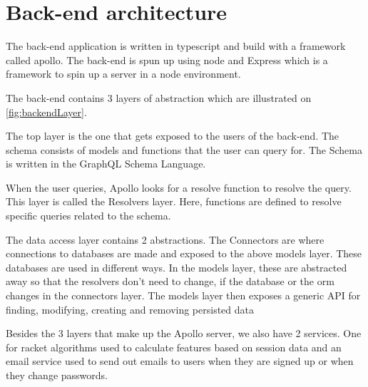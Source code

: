 \section{Back-end architecture}
The back-end application is written in \gls{typescript} and build with a framework called \gls{apollo}.
The back-end is spun up using \gls{node} and Express which is a framework to spin up a server in a \gls{node} environment.

The back-end contains 3 layers of abstraction which are illustrated on \ref{fig:backendLayer}.


The top layer is the one that gets exposed to the users of the back-end. The schema consists of models and functions that the user can query for. The Schema is written in the GraphQL Schema Language.

When the user queries, Apollo looks for a resolve function to resolve the query. This layer is called the Resolvers layer. Here, functions are defined to resolve specific queries related to the schema. 

The data access layer contains 2 abstractions. The Connectors are where connections to databases are made and exposed to the above models layer. These databases are used in different ways. In the models layer, these are abstracted away so that the resolvers don't need to change, if the database or the \gls{orm} changes in the connectors layer. The models layer then exposes a generic API for finding, modifying, creating and removing persisted data

Besides the 3 layers that make up the Apollo server, we also have 2 services. One for racket algorithms used to calculate features based on session data and an email service used to send out emails to users when they are signed up or when they change passwords.